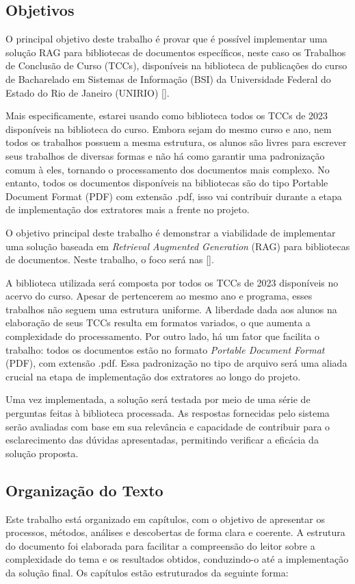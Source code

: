 \documentclass[a4paper, 12pt]{article}
\begin{document}
    \subsection{Objetivos}

    O principal objetivo deste trabalho é provar que é possível implementar uma solução RAG para bibliotecas de documentos específicos, neste caso os Trabalhos de Conclusão de Curso (TCCs), disponíveis na biblioteca de publicações do curso de Bacharelado em Sistemas de Informação (BSI) da Universidade Federal do Estado do Rio de Janeiro (UNIRIO) [\textcite{tccs_unirio}].

    Mais especificamente, estarei usando como biblioteca todos os TCCs de 2023 disponíveis na biblioteca do curso. Embora sejam do mesmo curso e ano, nem todos os trabalhos possuem a mesma estrutura, os alunos são livres para escrever seus trabalhos de diversas formas e não há como garantir uma padronização comum à eles, tornando o processamento dos documentos mais complexo. No entanto, todos os documentos disponíveis na bibliotecas são do tipo Portable Document Format (PDF) com extensão .pdf, isso vai contribuir durante a etapa de implementação dos extratores mais a frente no projeto.

    O objetivo principal deste trabalho é demonstrar a viabilidade de implementar uma solução baseada em \textit{Retrieval Augmented Generation} (RAG) para bibliotecas de documentos. Neste trabalho, o foco será nas  [\citeauthor{tccs_unirio}].

    A biblioteca utilizada será composta por todos os TCCs de 2023 disponíveis no acervo do curso. Apesar de pertencerem ao mesmo ano e programa, esses trabalhos não seguem uma estrutura uniforme. A liberdade dada aos alunos na elaboração de seus TCCs resulta em formatos variados, o que aumenta a complexidade do processamento. Por outro lado, há um fator que facilita o trabalho: todos os documentos estão no formato \textit{Portable Document Format} (PDF), com extensão .pdf. Essa padronização no tipo de arquivo será uma aliada crucial na etapa de implementação dos extratores ao longo do projeto.

    Uma vez implementada, a solução será testada por meio de uma série de perguntas feitas à biblioteca processada. As respostas fornecidas pelo sistema serão avaliadas com base em sua relevância e capacidade de contribuir para o esclarecimento das dúvidas apresentadas, permitindo verificar a eficácia da solução proposta.

    \subsection{Organização do Texto}
    Este trabalho está organizado em capítulos, com o objetivo de apresentar os processos, métodos, análises e descobertas de forma clara e coerente. A estrutura do documento foi elaborada para facilitar a compreensão do leitor sobre a complexidade do tema e os resultados obtidos, conduzindo-o até a implementação da solução final. Os capítulos estão estruturados da seguinte forma:
    
\end{document}
